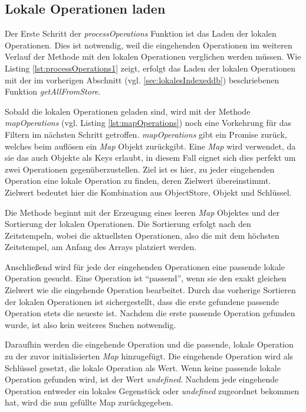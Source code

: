 \documentclass[a4paper, 12pt]{scrreprt}
\begin{document}
\subsection{Lokale Operationen laden}

Der Erste Schritt der \textit{processOperations} Funktion ist das Laden der lokalen Operationen. Dies ist notwendig, weil die eingehenden Operationen im weiteren Verlauf der Methode mit den lokalen Operationen verglichen werden müssen. Wie Listing \ref{lst:processOperations1} zeigt, erfolgt das Laden der lokalen Operationen mit der im vorherigen Abschnitt (vgl. \ref{sec:lokalesIndexeddb}) beschriebenen Funktion \textit{getAllFromStore}.

\begin{minipage}{\linewidth}
	
\end{minipage}

Sobald die lokalen Operationen geladen sind, wird mit der Methode \textit{mapOperations} (vgl. Listing \ref{lst:mapOperations}) noch eine Vorkehrung für das Filtern im nächsten Schritt getroffen. \textit{mapOperations} gibt ein Promise zurück, welches beim auflösen ein \textit{Map} Objekt zurückgibt. Eine \textit{Map} wird verwendet, da sie das auch Objekte als Keys erlaubt, in diesem Fall eignet sich dies perfekt um zwei Operationen gegenüberzustellen. Ziel ist es hier, zu jeder eingehenden Operation eine lokale Operation zu finden, deren Zielwert übereinstimmt. Zielwert bedeutet hier die Kombination aus ObjectStore, Objekt und Schlüssel. 

Die Methode beginnt mit der Erzeugung eines leeren \textit{Map} Objektes und der Sortierung der lokalen Operationen. Die Sortierung erfolgt nach den Zeitstempeln, wobei die aktuellsten Operationen, also die mit dem höchsten Zeitstempel, am Anfang des Arrays platziert werden. 

Anschließend wird für jede der eingehenden Operationen eine passende lokale Operation gesucht. Eine Operation ist \enquote{passend}, wenn sie den exakt gleichen Zielwert wie die eingehende Operation bearbeitet. Durch das vorherige Sortieren der lokalen Operationen ist sichergestellt, dass die erste gefundene passende Operation stets die neueste ist. Nachdem die erste passende Operation gefunden wurde, ist also kein weiteres Suchen notwendig.

Daraufhin werden die eingehende Operation und die passende, lokale Operation zu der zuvor initialisierten \textit{Map} hinzugefügt. Die eingehende Operation wird als Schlüssel gesetzt, die lokale Operation als Wert. Wenn keine passende lokale Operation gefunden wird, ist der Wert \textit{undefined}. Nachdem jede eingehende Operation entweder ein lokales Gegenstück oder \textit{undefined} zugeordnet bekommen hat, wird die nun gefüllte Map zurückgegeben. 
\end{document}
